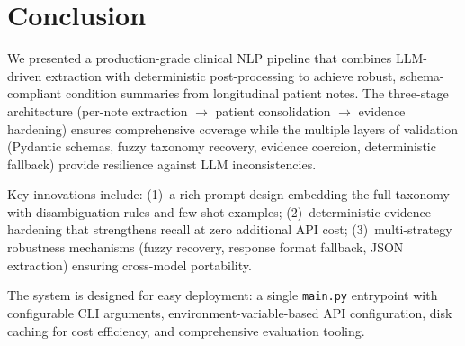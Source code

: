 \documentclass[11pt, a4paper]{article}
\begin{document}
\section{Conclusion}

We presented a production-grade clinical NLP pipeline that combines LLM-driven extraction with deterministic post-processing to achieve robust, schema-compliant condition summaries from longitudinal patient notes. The three-stage architecture (per-note extraction $\rightarrow$ patient consolidation $\rightarrow$ evidence hardening) ensures comprehensive coverage while the multiple layers of validation (Pydantic schemas, fuzzy taxonomy recovery, evidence coercion, deterministic fallback) provide resilience against LLM inconsistencies.

Key innovations include: (1)~a rich prompt design embedding the full taxonomy with disambiguation rules and few-shot examples; (2)~deterministic evidence hardening that strengthens recall at zero additional API cost; (3)~multi-strategy robustness mechanisms (fuzzy recovery, response format fallback, JSON extraction) ensuring cross-model portability.

The system is designed for easy deployment: a single \texttt{main.py} entrypoint with configurable CLI arguments, environment-variable-based API configuration, disk caching for cost efficiency, and comprehensive evaluation tooling.
\end{document}
